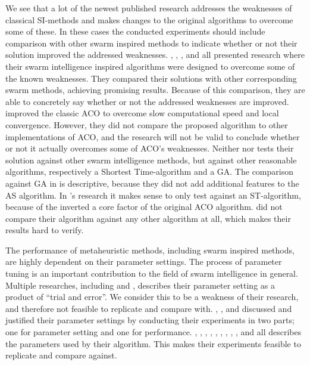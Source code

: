 We see that a lot of the newest published research addresses the weaknesses of classical SI-methods and makes changes to the original algorithms to overcome some of these. In these cases the conducted experiments should include comparison with other swarm inspired methods to indicate whether or not their solution improved the addressed weaknesses. \citet{tripathi09}, \citet{yang07}, \citet{salehinejad10}, and \citet{jiang10} all presented research where their swarm intelligence inspired algorithms were designed to overcome some of the known weaknesses. They compared their solutions with other corresponding swarm methods, achieving promising results. Because of this comparison, they are able to concretely say whether or not the addressed weaknesses are improved. \citet{sedighpour14} improved the classic ACO to overcome slow computational speed and local convergence. However, they did not compare the proposed algorithm to other implementations of ACO, and the research will not be valid to conclude whether or not it actually overcomes some of ACO's weaknesses. 
Neither \citet{dias14} nor \citet{poorzahedy11} tests their solution against other swarm intelligence methods, but against other reasonable algorithms, respectively a Shortest Time-algorithm and a GA. The comparison against GA in \citet{poorzahedy11} is descriptive, because they did not add additional features to the AS algorithm. In \citet{dias14}'s research it makes sense to only test against an ST-algorithm, because of the inverted a core factor of the original ACO algorithm. \citet{salehi-nezhad07} did not compare their algorithm against any other algorithm at all, which makes their results hard to verify. 

The performance of metaheuristic methods, including swarm inspired methods, are highly dependent on their parameter settings. The process of parameter tuning is an important contribution to the field of swarm intelligence in general. Multiple researches, including \citet{salehi-nezhad07} and \citet{yang07}, describes their parameter setting as a product of ``trial and error''. We consider this to be a weakness of their research, and therefore not feasible to replicate and compare with. \citet{sedighpour14}, \citet{poorzahedy11}, and \citet{kechagiopoulos14} discussed and justified their parameter settings by conducting their experiments in two parts; one for parameter setting and one for performance. \citet{hsiao04}, \citet{salehi-nezhad07}, \citet{tripathi09}, \citet{sedighpour14}, \citet{yang07}, \citet{salehinejad10}, \citet{jiang10}, \citet{poorzahedy11}, \citet{nikolic14}, and \citet{kechagiopoulos14} all describes the parameters used by their algorithm. This makes their experiments feasible to replicate and compare against.  

